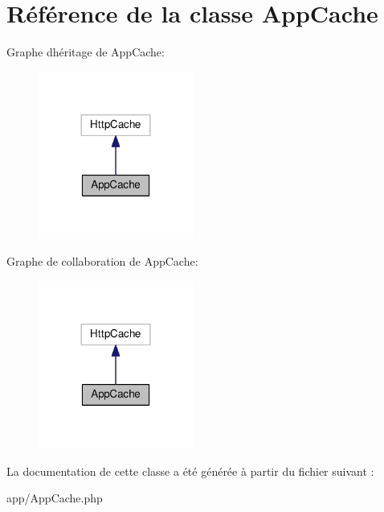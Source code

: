 \hypertarget{classAppCache}{}\section{Référence de la classe App\+Cache}
\label{classAppCache}


Graphe d\textquotesingle{}héritage de App\+Cache\+:\nopagebreak
\begin{figure}[H]
\begin{center}
\leavevmode
\includegraphics[width=144pt]{classAppCache__inherit__graph}
\end{center}
\end{figure}


Graphe de collaboration de App\+Cache\+:\nopagebreak
\begin{figure}[H]
\begin{center}
\leavevmode
\includegraphics[width=144pt]{classAppCache__coll__graph}
\end{center}
\end{figure}


La documentation de cette classe a été générée à partir du fichier suivant \+:\begin{DoxyCompactItemize}
\item 
app/App\+Cache.\+php\end{DoxyCompactItemize}
